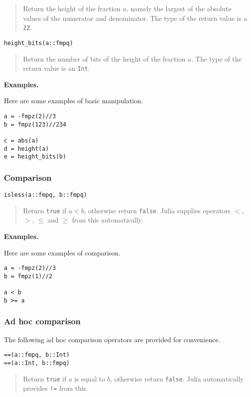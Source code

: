 \documentclass[a4paper,10pt]{article}
\newcommand{\code}{\lstinline}
\newcommand{\desc}[1]{\vspace{-3mm}\begin{quote}#1\end{quote}}
\begin{document}
{{\desc{Return the height of the fraction $a$, namely the largest of the absolute
values of the numerator and denominator. The type of the return value is a 
\code{ZZ}.}

\begin{lstlisting}
height_bits(a::fmpq)
\end{lstlisting}

\desc{Return the number of bits of the height of the fraction $a$. The type of
the return value is an \code{Int}.}

\textbf{Examples.}

Here are some examples of basic manipulation.

\begin{lstlisting}
a = -fmpz(2)//3
b = fmpz(123)//234

c = abs(a)
d = height(a)
e = height_bits(b)
\end{lstlisting}

\subsubsection{Comparison}

\begin{lstlisting}
isless(a::fmpq, b::fmpq) 
\end{lstlisting}

\desc{Return \code{true} if $a < b$, otherwise return \code{false}. Julia
supplies operators $<$, $>$, $\leq$ and $\geq$ from this automatically.}

\textbf{Examples.}

Here are some examples of comparison.

\begin{lstlisting}
a = -fmpz(2)//3
b = fmpz(1)//2

a < b
b >= a
\end{lstlisting}

\subsubsection{Ad hoc comparison}

The following ad hoc comparison operators are provided for convenience.

\begin{lstlisting}
==(a::fmpq, b::Int)
==(a::Int, b::fmpq)
\end{lstlisting}

\desc{Return \code{true} if $a$ is equal to $b$, otherwise return \code{false}. Julia
automatically provides \code{!=} from this.}

}}
\end{document}
